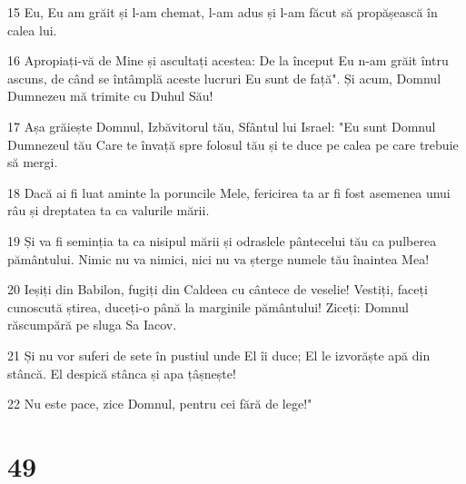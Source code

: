 \par 15 Eu, Eu am grăit și l-am chemat, l-am adus și l-am făcut să propășească în calea lui.
\par 16 Apropiați-vă de Mine și ascultați acestea: De la început Eu n-am grăit întru ascuns, de când se întâmplă aceste lucruri Eu sunt de față". Și acum, Domnul Dumnezeu mă trimite cu Duhul Său!
\par 17 Așa grăiește Domnul, Izbăvitorul tău, Sfântul lui Israel: "Eu sunt Domnul Dumnezeul tău Care te învață spre folosul tău și te duce pe calea pe care trebuie să mergi.
\par 18 Dacă ai fi luat aminte la poruncile Mele, fericirea ta ar fi fost asemenea unui râu și dreptatea ta ca valurile mării.
\par 19 Și va fi seminția ta ca nisipul mării și odraslele pântecelui tău ca pulberea pământului. Nimic nu va nimici, nici nu va șterge numele tău înaintea Mea!
\par 20 Ieșiți din Babilon, fugiți din Caldeea cu cântece de veselie! Vestiți, faceți cunoscută știrea, duceți-o până la marginile pământului! Ziceți: Domnul răscumpără pe sluga Sa Iacov.
\par 21 Și nu vor suferi de sete în pustiul unde El îi duce; El le izvorăște apă din stâncă. El despică stânca și apa țâșnește!
\par 22 Nu este pace, zice Domnul, pentru cei fără de lege!"

\chapter{49}


